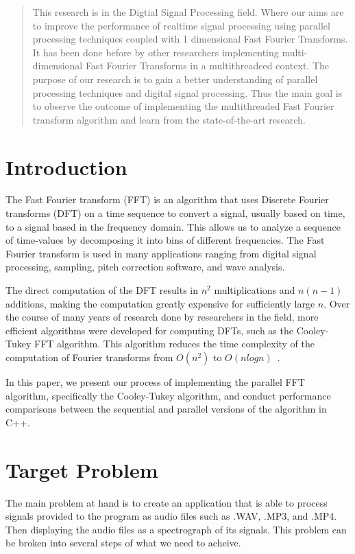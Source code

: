 \documentclass[journal]{IEEEtran}
\begin{document}
\maketitle

\begin{abstract}
This research is in the Digtial Signal Processing field. Where our aims are to improve the performance of realtime signal processing using parallel processing techniques coupled with 1 dimensional Fast Fourier Transforms.  It has been done before by other researchers implementing multi-dimensional Fast Fourier Transforms in a multithreadeed context. The purpose of our research is to gain a better understanding of parallel processing techniques and digital signal processing. Thus the main goal is to observe the outcome of implementing the multithreaded Fast Fourier transform algorithm and learn from the state-of-the-art research.
\end{abstract}

\section{Introduction}
	\par The Fast Fourier transform (FFT) is an algorithm that uses Discrete Fourier transforms (DFT) on a time sequence to convert a signal, usually based on time, to a signal based in the frequency domain. This allows us to analyze a sequence of time-values by decomposing it into bins of different frequencies. The Fast Fourier transform is used in many applications ranging from digital signal processing, sampling, pitch correction software, and wave analysis.

	\par The direct computation of the DFT results in $n^2$ multiplications and $n(n-1)$ additions, making the computation greatly expensive for sufficiently large $n$.  Over the course of many years of research done by researchers in the field, more efficient algorithms were developed for computing DFTs, such as the Cooley-Tukey FFT algorithm. This algorithm reduces the time complexity of the computation of Fourier transforms from $O(n^2)$ to $O(nlogn)$~\cite{Xiang}.

	\par In this paper, we present our process of implementing the parallel FFT algorithm, specifically the Cooley-Tukey algorithm, and conduct performance comparisons between the sequential and parallel versions of the algorithm in C++.

\section{Target Problem}
	\par The main problem at hand is to create an application that is able to process signals provided to the program as audio files such as .WAV, .MP3, and .MP4. Then displaying the audio files as a spectrograph of its signals. This problem can be broken into several steps of what we need to acheive.
\end{document}
